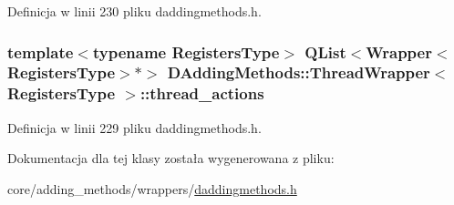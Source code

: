 Definicja w linii 230 pliku daddingmethods.\-h.

\hypertarget{class_d_adding_methods_1_1_thread_wrapper_a17fc0920f489293031ab914cb8d36ba7}{
\subsubsection[{thread\-\_\-actions}]{\setlength{\rightskip}{0pt plus 5cm}template$<$typename Registers\-Type$>$ Q\-List$<${\bf Wrapper}$<$Registers\-Type$>$$\ast$$>$ {\bf D\-Adding\-Methods\-::\-Thread\-Wrapper}$<$ Registers\-Type $>$\-::thread\-\_\-actions}}\label{class_d_adding_methods_1_1_thread_wrapper_a17fc0920f489293031ab914cb8d36ba7}


Definicja w linii 229 pliku daddingmethods.\-h.



Dokumentacja dla tej klasy została wygenerowana z pliku\-:\begin{DoxyCompactItemize}
\item 
core/adding\-\_\-methods/wrappers/\hyperlink{daddingmethods_8h}{daddingmethods.\-h}\end{DoxyCompactItemize}

